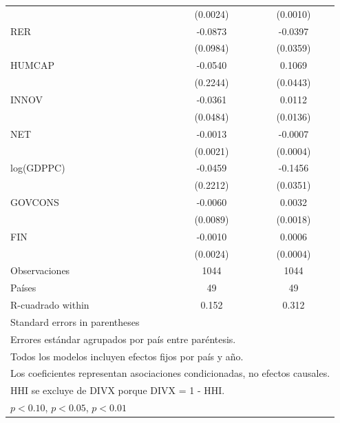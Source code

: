 \begin{table}[htbp]
\begin{tabular}{l*{2}{c}}
                    &    (0.0024)         &    (0.0010)         \\
\addlinespace
RER                 &     -0.0873         &     -0.0397         \\
                    &    (0.0984)         &    (0.0359)         \\
\addlinespace
HUMCAP              &     -0.0540         &      0.1069\sym{**} \\
                    &    (0.2244)         &    (0.0443)         \\
\addlinespace
INNOV               &     -0.0361         &      0.0112         \\
                    &    (0.0484)         &    (0.0136)         \\
\addlinespace
NET                 &     -0.0013         &     -0.0007\sym{**} \\
                    &    (0.0021)         &    (0.0004)         \\
\addlinespace
log(GDPPC)          &     -0.0459         &     -0.1456\sym{***}\\
                    &    (0.2212)         &    (0.0351)         \\
\addlinespace
GOVCONS             &     -0.0060         &      0.0032\sym{*}  \\
                    &    (0.0089)         &    (0.0018)         \\
\addlinespace
FIN                 &     -0.0010         &      0.0006         \\
                    &    (0.0024)         &    (0.0004)         \\
\midrule
Observaciones       &        1044         &        1044         \\
Países              &          49         &          49         \\
R-cuadrado within   &       0.152         &       0.312         \\
\bottomrule
\multicolumn{3}{l}{\footnotesize Standard errors in parentheses}\\
\multicolumn{3}{l}{\footnotesize Errores estándar agrupados por país entre paréntesis.}\\
\multicolumn{3}{l}{\footnotesize Todos los modelos incluyen efectos fijos por país y año.}\\
\multicolumn{3}{l}{\footnotesize Los coeficientes representan asociaciones condicionadas, no efectos causales.}\\
\multicolumn{3}{l}{\footnotesize HHI se excluye de DIVX porque DIVX = 1 - HHI.}\\
\multicolumn{3}{l}{\footnotesize \sym{*} \(p<0.10\), \sym{**} \(p<0.05\), \sym{***} \(p<0.01\)}\\
\end{tabular}
\end{table}
